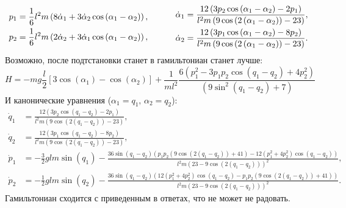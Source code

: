\begin{equation*}
    \left.\begin{aligned}
        p_1 &= 
        \frac{1}{6} l^2 m \left(8 \dot{\alpha}_1 +3 \dot{\alpha}_2  \cos \left(\alpha _1-\alpha _2\right)\right), \\
        p_2 &= 
        \frac{1}{6} l^2 m \left(
        2 \dot{\alpha}_2  +
        3 \dot{\alpha}_1  \cos \left(\alpha _1-\alpha _2\right)
        \right),
        \\
    \end{aligned}\right.
    \hspace{10 mm} 
    \left.\begin{aligned}
        \dot{\alpha}_1 &=  \frac{12 \left(3 p_2 \cos \left(\alpha _1-\alpha _2\right)-2 p_1\right)}{l^2 m \left(9 \cos \left(2 \left(\alpha _1-\alpha _2\right)\right)-23\right)},\\
        \dot{\alpha}_2 &= \frac{12 \left(3 p_1 \cos \left(\alpha _1-\alpha _2\right)-8 p_2\right)}{l^2 m \left(9 \cos \left(2 \left(\alpha _1-\alpha _2\right)\right)-23\right)}. \\
    \end{aligned}\right.
\end{equation*}
Возможно, после подтстановки станет в гамильтониан станет лучше:
\begin{equation*}
    H = - m g \frac{l}{2} 
    \left[3 \cos \left(\alpha _1\right)- \cos \left(\alpha _2\right)\right]
    +
    \frac{1}{ml^2}
    \frac{
        6 \left(p_1^2-3 p_1 p_2 \cos (q_1-q_2)+4 p_2^2\right)
    }{
        \left(9 \sin ^2(q_1-q_2)+7\right)
    }
\end{equation*}
И канонические уравнения ($\alpha_1 = q_1, \, \alpha_2 = q_2$):
\begin{align*}
\dot{q}_1 &= \frac{12 (3 p_2 \cos (q_1-q_2)-2 p_1)}{l^2 m (9 \cos (2 (q_1-q_2))-23)}, \\
\dot{q}_2 &= \frac{12 (3 p_1 \cos (q_1-q_2)-8 p_2)}{l^2 m (9 \cos (2 (q_1-q_2))-23)}, \\
\dot{p}_1 &= -\frac{3}{2} g l m \sin (q_1)-\frac{36 \sin (q_1-q_2) \left(p_1 p_2 (9 \cos (2 (q_1-q_2))+41)-12 \left(p_1^2+4 p_2^2\right) \cos (q_1-q_2)\right)}{l^2 m (23-9 \cos (2 (q_1-q_2)))^2}, \\
\dot{p}_2 &= -\frac{1}{2} g l m \sin (q_2)-\frac{36 \sin (q_1-q_2) \left(12 \left(p_1^2+4 p_2^2\right) \cos (q_1-q_2)-p_1 p_2 (9 \cos (2 (q_1-q_2))+41)\right)}{l^2 m (23-9 \cos (2 (q_1-q_2)))^2}. 
\end{align*}
Гамильтониан сходится с приведенным в ответах, что не может не радовать. 


